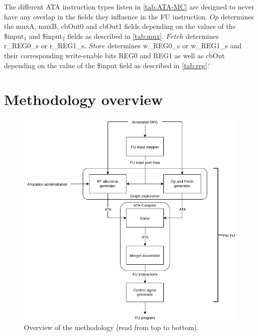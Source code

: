 The different ATA instruction types listen in \ref{tab:ATA-MC} are designed to never have any overlap in the fields they influence in the FU instruction. $Op$ determines the muxA, muxB, cbOut0 and cbOut1 fields depending on the values of the \$input$_1$ and \$input$_2$ fields as described in \ref{tab:mux}. $Fetch$ determines r\_REG0\_s or r\_REG1\_s. $Store$ determines w\_REG0\_s or w\_REG1\_s and their corresponding write-enable bits REG0 and REG1 as well as cbOut depending on the value of the \$input field as described in \ref{tab:reg}.`


\section{Methodology overview}
\label{sec:overview}

\begin{figure}
    \centering
    \includegraphics[scale=0.45]{graphs/methodology.png}
    \caption{Overview of the methodology (read from top to bottom).}
    \label{fig:framework}
\end{figure}

